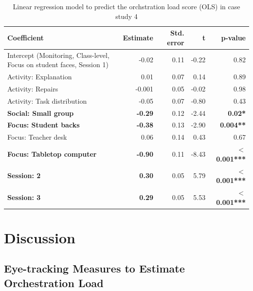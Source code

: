 \documentclass[10pt,journal,compsoc]{IEEEtran}
\begin{document}
\begin{table}[!t]
\caption{Linear regression model to predict the orchstration load score (OLS) in case study 4}
\label{tab:case4results}
\centering
\begin{tabular}{|p{2.6cm}||r|r|r|r|}
\hline
Coefficient & Estimate & Std. error & t & p-value\\
\hline
\hline
Intercept (Monitoring, Class-level, Focus on student faces, Session 1) & -0.02 & 0.11 & -0.22 & 0.82\\
Activity: Explanation & 0.01 & 0.07 & 0.14 & 0.89\\
Activity: Repairs & -0.001 & 0.05 & -0.02 & 0.98\\
Activity: Task distribution & -0.05 & 0.07 & -0.80 & 0.43\\
\textbf{Social: Small group} & \textbf{-0.29} & 0.12 & -2.44 & \textbf{0.02*}\\
\textbf{Focus: Student backs} & \textbf{-0.38} & 0.13 & -2.90 & \textbf{0.004**}\\
Focus: Teacher desk & 0.06 & 0.14 & 0.43 & 0.67\\
\textbf{Focus: Tabletop computer} & \textbf{-0.90} & 0.11 & -8.43 & \textbf{$<$0.001***}\\
\textbf{Session: 2} & \textbf{0.30} & 0.05 & 5.79 & \textbf{$<$0.001***}\\
\textbf{Session: 3} & \textbf{0.29} & 0.05 & 5.53 & \textbf{$<$0.001***}\\
\hline
\end{tabular}
\end{table}


\section{Discussion}
\label{sec:discussion}

\subsection{Eye-tracking Measures to Estimate Orchestration Load}
\end{document}
